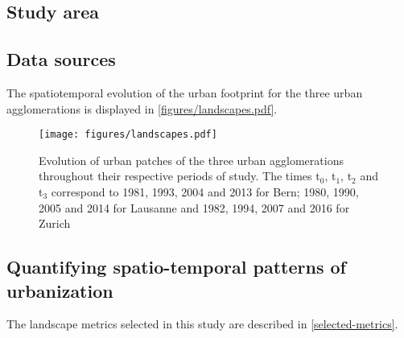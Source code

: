 \documentclass[10pt,letterpaper]{article}
\begin{document}
\subsection*{Study area}

\subsection*{Data sources}

The spatiotemporal evolution of the urban footprint for the three urban agglomerations is displayed in \autoref{figures/landscapes.pdf}.

\begin{figure}[!ht]
  \begin{adjustwidth}{-.4\textwidth}{0cm}
    \centering  
    \texttt{[image: figures/landscapes.pdf]}
    \vspace{.5em}
    \caption[Evolution of urban patches]{\label{figures/landscapes.pdf}Evolution of urban patches of the three urban agglomerations throughout their respective periods of study. The times t$_0$, t$_1$, t$_2$ and t$_3$ correspond to 1981, 1993, 2004 and 2013 for Bern; 1980, 1990, 2005 and 2014 for Lausanne and 1982, 1994, 2007 and 2016 for Zurich}
  \end{adjustwidth}
\end{figure}

\subsection*{Quantifying spatio-temporal patterns of urbanization}

The landscape metrics selected in this study are described in \autoref{selected-metrics}.
\end{document}
